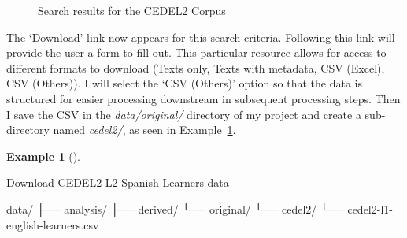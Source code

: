 \documentclass[
  letterpaper,
]{latex/krantz}
\newenvironment{Shaded}{\begin{snugshade}}{\end{snugshade}}
\newcommand{\ExtensionTok}[1]{\textcolor[rgb]{0.00,0.00,0.00}{#1}}
\newcommand{\NormalTok}[1]{\textcolor[rgb]{0.00,0.00,0.00}{#1}}
\theoremstyle{definition}
\newtheorem{example}{Example}[chapter]
\theoremstyle{remark}
\begin{document}
\begin{figure}[H]


\caption{\label{fig-ad-cedel2-results}Search results for the CEDEL2
Corpus}

\end{figure}%

The `Download' link now appears for this search criteria. Following this
link will provide the user a form to fill out. This particular resource
allows for access to different formats to download (Texts only, Texts
with metadata, CSV (Excel), CSV (Others)). I will select the `CSV
(Others)' option so that the data is structured for easier processing
downstream in subsequent processing steps. Then I save the CSV in the
\emph{data/original/} directory of my project and create a sub-directory
named \emph{cedel2/}, as seen in
Example~\ref{exm-ad-cedel2-learners-download}.

\begin{example}[]\protect\hypertarget{exm-ad-cedel2-learners-download}{}\label{exm-ad-cedel2-learners-download}

Download CEDEL2 L2 Spanish Learners data

\begin{Shaded}
\begin{Highlighting}[]
\ExtensionTok{data/}
\ExtensionTok{├──}\NormalTok{ analysis/}
\ExtensionTok{├──}\NormalTok{ derived/}
\ExtensionTok{└──}\NormalTok{ original/}
    \ExtensionTok{└──}\NormalTok{ cedel2/}
    \ExtensionTok{└──}\NormalTok{ cedel2{-}l1{-}english{-}learners.csv}
\end{Highlighting}
\end{Shaded}

\end{example}
\end{document}
